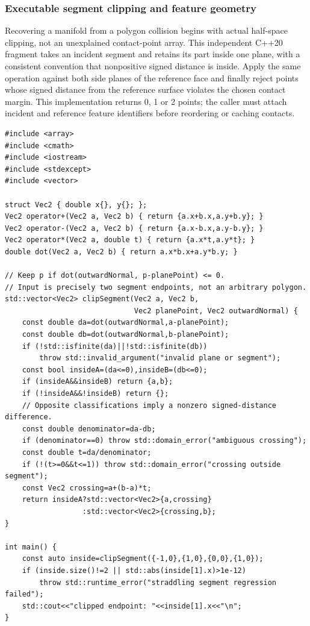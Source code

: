 \subsubsection{Executable segment clipping and feature geometry}\label{04-visual-computing-ii-ch026-executable-segment-clipping-and-feature-geometry}

\hypertarget{04-visual-computing-ii-ch026-executable-segment-clipping-and-feature-geometry}{}

Recovering a manifold from a polygon collision begins with actual half-space clipping, not an unexplained contact-point array. This independent C++20 fragment takes an incident segment and retains its part inside one plane, with a consistent convention that nonpositive signed distance is inside. Apply the same operation against both side planes of the reference face and finally reject points whose signed distance from the reference surface violates the chosen contact margin. This implementation returns 0, 1 or 2 points; the caller must attach incident and reference feature identifiers before reordering or caching contacts.

\begin{verbatim}
#include <array>
#include <cmath>
#include <iostream>
#include <stdexcept>
#include <vector>

struct Vec2 { double x{}, y{}; };
Vec2 operator+(Vec2 a, Vec2 b) { return {a.x+b.x,a.y+b.y}; }
Vec2 operator-(Vec2 a, Vec2 b) { return {a.x-b.x,a.y-b.y}; }
Vec2 operator*(Vec2 a, double t) { return {a.x*t,a.y*t}; }
double dot(Vec2 a, Vec2 b) { return a.x*b.x+a.y*b.y; }

// Keep p if dot(outwardNormal, p-planePoint) <= 0.
// Input is precisely two segment endpoints, not an arbitrary polygon.
std::vector<Vec2> clipSegment(Vec2 a, Vec2 b,
                              Vec2 planePoint, Vec2 outwardNormal) {
    const double da=dot(outwardNormal,a-planePoint);
    const double db=dot(outwardNormal,b-planePoint);
    if (!std::isfinite(da)||!std::isfinite(db))
        throw std::invalid_argument("invalid plane or segment");
    const bool insideA=(da<=0),insideB=(db<=0);
    if (insideA&&insideB) return {a,b};
    if (!insideA&&!insideB) return {};
    // Opposite classifications imply a nonzero signed-distance difference.
    const double denominator=da-db;
    if (denominator==0) throw std::domain_error("ambiguous crossing");
    const double t=da/denominator;
    if (!(t>=0&&t<=1)) throw std::domain_error("crossing outside segment");
    const Vec2 crossing=a+(b-a)*t;
    return insideA?std::vector<Vec2>{a,crossing}
                  :std::vector<Vec2>{crossing,b};
}

int main() {
    const auto inside=clipSegment({-1,0},{1,0},{0,0},{1,0});
    if (inside.size()!=2 || std::abs(inside[1].x)>1e-12)
        throw std::runtime_error("straddling segment regression failed");
    std::cout<<"clipped endpoint: "<<inside[1].x<<"\n";
}
\end{verbatim}


